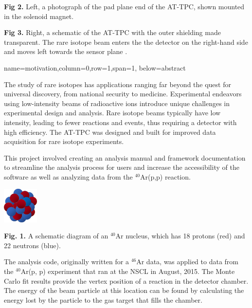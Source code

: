 \documentclass[ansiepaper,portrait]{baposter}
\begin{document}
\begin{poster}
{\small{\textbf{Fig 2.} Left, a photograph of the pad plane end of the AT-TPC, shown mounted in the solenoid magnet.}

\small{\textbf{Fig 3.} Right, a schematic of the AT-TPC with the outer shielding made transparent. The rare isotope beam enters the the detector on the right-hand side and moves left towards the sensor plane \cite{Bradt-thesis}.}

}
{name=motivation,column=0,row=1,span=1, below=abstract}
{\small{The study of rare isotopes has applications ranging far beyond the quest for universal discovery, from national security to medicine. Experimental endeavors using low-intensity beams of radioactive ions introduce unique challenges in experimental design and analysis. Rare isotope beams typically have low intensity, leading to fewer reactions and events, thus requiring a detector with high efficiency. The AT-TPC was designed and built for improved data acquisition for rare isotope experiments. 

This project involved creating an analysis manual and framework documentation to streamline the analysis process for users and increase the accessibility of the software as well as analyzing data from the $^{40}$Ar(p,p) reaction.}

\begin{center}
\includegraphics[width=18mm]{ar40_nucleus.png}
\end{center}

\small{\textbf{Fig. 1.} A schematic diagram of an $^{40}$Ar nucleus, which has 18 protons (red) and 22 neutrons (blue).}
}
{\small{The analysis code, originally written for a $^{46}$Ar data, was applied to data from the $^{40}$Ar(p, p) experiment that ran at the NSCL in August,  2015.}
\small{The Monte Carlo fit results provide the vertex position of a reaction in the detector chamber. The energy of the beam particle at this location can be found by calculating the energy lost by the particle to the gas target that fills the chamber.}

}
\end{poster}
\end{document}
